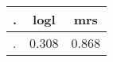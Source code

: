 \begin{table}[!tbp]
\begin{center}
\begin{tabular}{lll}
\hline\hline
\multicolumn{1}{c}{.}&\multicolumn{1}{c}{logl}&\multicolumn{1}{c}{mrs}\tabularnewline
\hline
.&0.308&0.868\tabularnewline
\hline
\end{tabular}\end{center}
\end{table}
